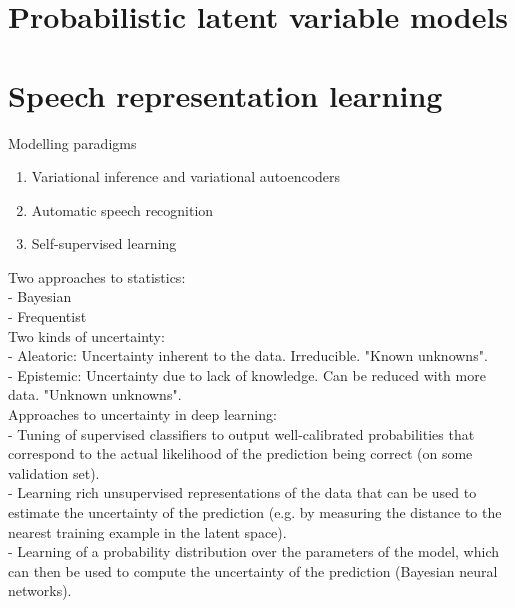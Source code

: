 




\section{Probabilistic latent variable models}




\section{Speech representation learning}





Modelling paradigms
\begin{enumerate}
    \item Variational inference and variational autoencoders
    \item Automatic speech recognition
    \item Self-supervised learning
\end{enumerate}

\cite{kingma_autoencoding_2014}
\cite{rezende_stochastic_2014}

Two approaches to statistics:\\
- Bayesian\\
- Frequentist\\

Two kinds of uncertainty:\\
- Aleatoric: Uncertainty inherent to the data. Irreducible. "Known unknowns".\\
- Epistemic: Uncertainty due to lack of knowledge. Can be reduced with more data. "Unknown unknowns".\\

Approaches to uncertainty in deep learning:\\
- Tuning of supervised classifiers to output well-calibrated probabilities that correspond to the actual likelihood of the prediction being correct (on some validation set).\\
- Learning rich unsupervised representations of the data that can be used to estimate the uncertainty of the prediction (e.g. by measuring the distance to the nearest training example in the latent space).\\
- Learning of a probability distribution over the parameters of the model, which can then be used to compute the uncertainty of the prediction (Bayesian neural networks).\\


